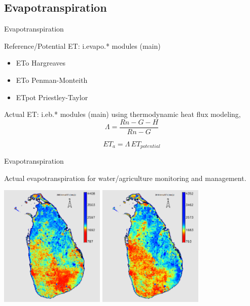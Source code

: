 \documentclass[xcolor=dvipsnames,beamer]{beamer} %
\begin{document}
\subsection{Evapotranspiration}
\begin{frame}[fragile]{Evapotranspiration}

Reference/Potential ET: i.evapo.* modules (main)\\

\begin{itemize}
 \item ETo Hargreaves 
 \item ETo Penman-Monteith
 \item ETpot Priestley-Taylor
\end{itemize}

Actual ET: i.eb.* modules (main) using thermodynamic heat flux modeling,\\

\begin{equation}\label{eq1}
\Lambda = \frac {Rn - G - H} {Rn - G}
\end{equation}

\begin{equation}\label{eq2}
ET_a = \Lambda \, ET_{potential}
\end{equation}
\end{frame}

\begin{frame}[fragile]{Evapotranspiration}

Actual evapotranspiration for water/agriculture monitoring and management.\\

\begin{center}
 \includegraphics[width=5cm]{slet2005}
 \hspace{10mm}
 \includegraphics[width=5cm]{slet2010}
\end{center}

\end{frame}
\end{document}

